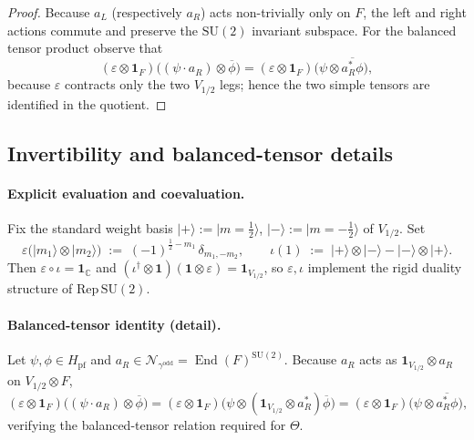 \documentclass[11pt]{article}
\begin{document}
\begin{proof}
  Because $a_L$ (respectively $a_R$) acts non-trivially only on $F$,
  the left and right actions commute and preserve the $\mathrm{SU}(2)$
  invariant subspace.  For the balanced tensor product observe that
  \[
    (\varepsilon\!\otimes\!\mathbf1_F)
    \bigl((\psi\cdot a_R)\otimes\overline\phi\bigr)
    =(\varepsilon\!\otimes\!\mathbf1_F)
    \bigl(\psi\otimes\overline{a_R^{*}\phi}\bigr),
  \]
  because $\varepsilon$ contracts only the two $V_{1/2}$ legs; hence the
  two simple tensors are identified in the quotient.
\end{proof}

\subsection*{Invertibility and balanced-tensor details}

\paragraph{Explicit evaluation and coevaluation.}
Fix the standard weight basis
$|+\rangle:=|m=\tfrac12\rangle$, $|-\rangle:=|m=-\tfrac12\rangle$ of
$V_{1/2}$.
Set
\[
  \varepsilon\bigl(|m_1\rangle\!\otimes|m_2\rangle\bigr)
  \;:=\;
  (-1)^{\tfrac12-m_1}\,\delta_{m_1,-m_2},
  \qquad
  \iota(1)
  \;:=\;
  |+\rangle\!\otimes|-\rangle-|-\rangle\!\otimes|+\rangle.
\]
Then $\varepsilon\circ\iota=\mathbf1_{\mathbb C}$ and
$(\iota^\dagger\!\otimes\!\mathbf1)(\mathbf1\!\otimes\!\varepsilon)
=\mathbf1_{V_{1/2}}$, so $\varepsilon,\iota$ implement the rigid duality
structure of $\mathrm{Rep}\,\mathrm{SU}(2)$.

\paragraph{Balanced-tensor identity (detail).}
Let
$\psi,\phi\in H_{\mathrm{pf}}$ and
$a_R\in\mathcal N_{\gamma^{\mathrm{odd}}}=\operatorname{End}(F)^{\mathrm{SU}(2)}$.
Because $a_R$ acts as $\mathbf1_{V_{1/2}}\!\otimes a_R$ on
$V_{1/2}\!\otimes F$,
\[
  (\varepsilon\!\otimes\!\mathbf1_F)\bigl((\psi\cdot a_R)\otimes\overline\phi\bigr)
  =(\varepsilon\!\otimes\!\mathbf1_F)\bigl(\psi\otimes
  (\mathbf1_{V_{1/2}}\!\otimes a_R^{*})\overline\phi\bigr)
  =(\varepsilon\!\otimes\!\mathbf1_F)\bigl(\psi\otimes\overline{a_R^{*}\phi}\bigr),
\]
verifying the balanced-tensor relation required for $\Theta$.
\end{document}
